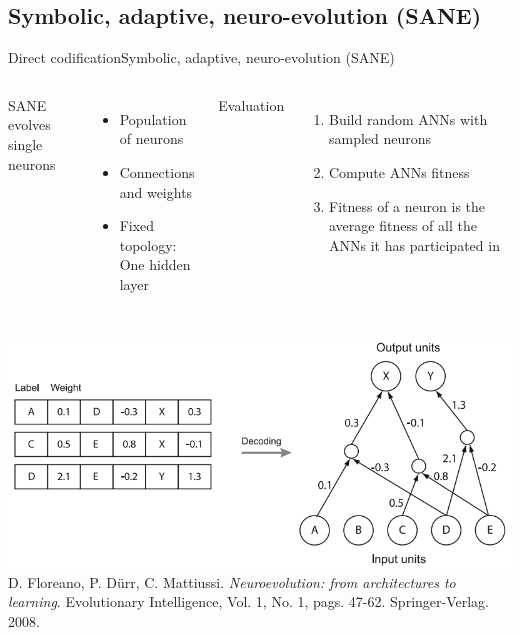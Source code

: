 \documentclass[10pt,compress]{beamer} %
\begin{document}
\subsection{Symbolic, adaptive, neuro-evolution (SANE)}
\begin{frame}{Direct codification}{Symbolic, adaptive, neuro-evolution (SANE)}
    \begin{columns}
		SANE evolves single neurons
		\begin{itemize}
			\item Population of neurons
			\item Connections and weights
			\item Fixed topology: One hidden layer
		\end{itemize}
		Evaluation
		\begin{enumerate}
			\item Build random ANNs with sampled neurons
			\item Compute ANNs fitness
			\item Fitness of a neuron is the average fitness of all the ANNs it has participated in
		\end{enumerate}
	\end{columns}
		\begin{center}
		\includegraphics[width=0.5\linewidth]{figs/sane.png}\\
    	\tiny{ D. Floreano, P. D\"urr, C. Mattiussi. \textit{Neuroevolution: from architectures to learning}. Evolutionary Intelligence, Vol. 1, No. 1, pags. 47-62. Springer-Verlag. 2008.}
		\end{center}
\end{frame}
\end{document}

